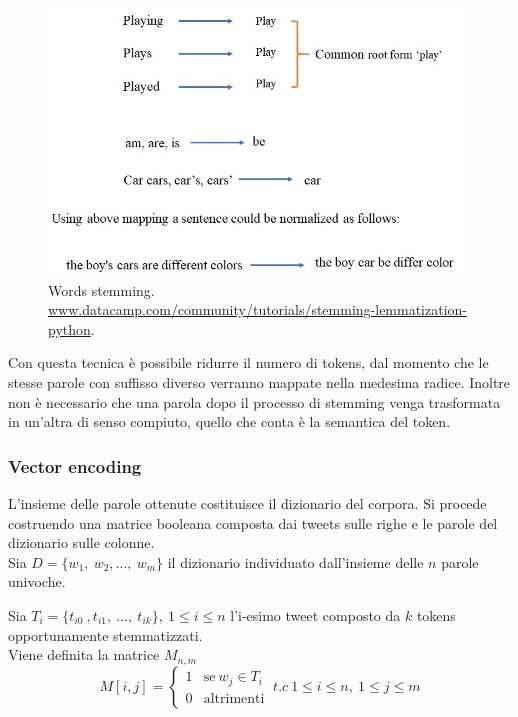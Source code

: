 \documentclass[oneside]{book}
\begin{document}
\begin{figure}[!h]
	\centering
	\includegraphics[width=11cm]{assets/stemming.jpg}
	\caption{Words stemming. \\ \url{www.datacamp.com/community/tutorials/stemming-lemmatization-python}.}
	\label{fig:stemming}
\end{figure}

Con questa tecnica è possibile ridurre il numero di tokens, dal momento che le stesse parole con suffisso diverso verranno mappate nella medesima radice. Inoltre non è necessario che una parola dopo il processo di stemming venga trasformata in un'altra di senso compiuto, quello che conta è la semantica del token.


\subsubsection{Vector encoding}

L'insieme delle parole ottenute costituisce il dizionario del corpora. Si procede costruendo una matrice booleana composta dai tweets sulle righe e le parole del dizionario sulle colonne.\\

Sia $D = \{w_1,\ w_2, ...,\ w_m\}$ il dizionario individuato dall'insieme delle $n$ parole univoche.

Sia $T_i = \{t_{i0}\ ,t_{i1},\ ...,\ t_{ik}\}, \ 1 \leq i \leq n$ l'i-esimo tweet composto da $k$ tokens opportunamente stemmatizzati.\\

Viene definita la matrice $M_{n,m}$
\[
M[i,j] =
\begin{cases}
1 & \text{se}\ w_j \in T_i\\
0 & \text{altrimenti}
\end{cases}
\ t.c\ 1\leq i\leq n,\ 1 \leq j \leq m
\]
\end{document}
